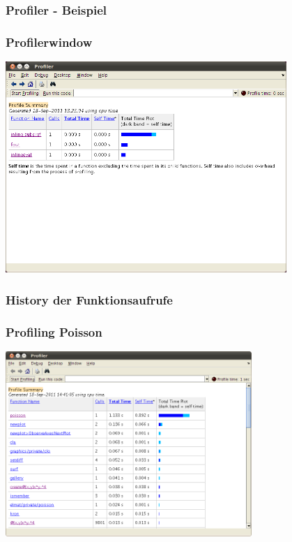 \documentclass[hyperref={xetex}]{beamer}
\begin{document}
\begin{frame}[fragile]\frametitle{Profiler - Beispiel}


\end{frame}

\begin{frame}[fragile]\frametitle{Profilerwindow}
\begin{center}
\includegraphics[width=0.8\textwidth]{./figures/profilertest}
\end{center}
\end{frame}

\begin{frame}[fragile]\frametitle{History der Funktionsaufrufe}

\end{frame}

\begin{frame}[fragile]\frametitle{Profiling Poisson}

\begin{center}
\includegraphics[width=0.7\textwidth]{./figures/profile_poisson}
\end{center}
\end{frame}
\end{document}
